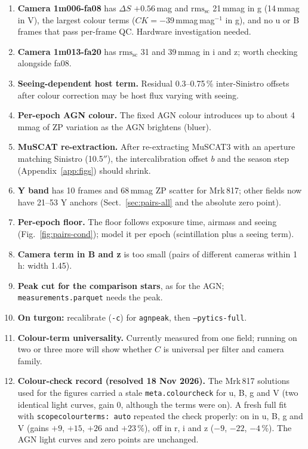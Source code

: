 \documentclass[10pt,a4paper,oneside]{report}
\renewcommand{\_}{\oldunderscore\allowbreak}
\begin{document}
\begin{enumerate}
  \item \textbf{Camera 1m006-fa08} has $\Delta S$ $+0.56$\,mag and $\mathrm{rms}_\mathrm{sc}$ 21\,mmag in g
        (14\,mmag in V), the largest colour terms ($CK = -39$\,mmag\,mag$^{-1}$ in g), and no u or B frames
        that pass per-frame QC. Hardware investigation needed.
  \item \textbf{Camera 1m013-fa20} has $\mathrm{rms}_\mathrm{sc}$ 31 and 39\,mmag in i and z; worth checking
        alongside fa08.
  \item \textbf{Seeing-dependent host term.} Residual 0.3--0.75\,\% inter-Sinistro offsets after colour
        correction may be host flux varying with seeing.
  \item \textbf{Per-epoch AGN colour.} The fixed AGN colour introduces up to about 4\,mmag of ZP variation as
        the AGN brightens (bluer).
  \item \textbf{MuSCAT re-extraction.} After re-extracting MuSCAT3 with an aperture matching Sinistro
        (10.5$''$), the intercalibration offset $b$ and the season step (Appendix~\ref{app:figs}) should
        shrink.
  \item \textbf{Y band} has 10 frames and 68\,mmag ZP scatter for Mrk\,817; other fields now have 21--53 Y
        anchors (Sect.~\ref{sec:pairs-all} and the absolute zero point).
  \item \textbf{Per-epoch floor.} The floor follows exposure time, airmass and seeing
        (Fig.~\ref{fig:pairs-cond}); model it per epoch (scintillation plus a seeing term).
  \item \textbf{Camera term in B and z} is too small (pairs of different cameras within 1\,h: width 1.45).
  \item \textbf{Peak cut for the comparison stars}, as for the AGN; \texttt{measurements.parquet} needs the peak.
  \item \textbf{On turgon:} recalibrate (\texttt{-c}) for \texttt{agn\_peak}, then \texttt{--pytics-full}.
  \item \textbf{Colour-term universality.} Currently measured from one field; running on two or three
        more will show whether $C$ is universal per filter and camera family.
  \item \textbf{Colour-check record (resolved 18 Nov 2026).} The Mrk\,817 solutions used for the
        figures carried a stale \texttt{meta.colour\_check} for u, B, g and V (two identical light curves,
        gain 0, although the terms were on). A fresh full fit with \texttt{scope\_colour\_terms: auto}
        repeated the check properly: on in u, B, g and V (gains $+9$, $+15$, $+26$ and $+23$\,\%), off
        in r, i and z ($-9$, $-22$, $-4$\,\%). The AGN light curves and zero points are unchanged.
\end{enumerate}
\end{document}
